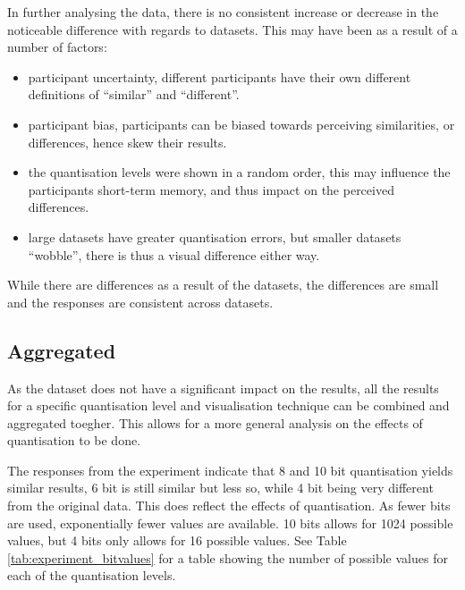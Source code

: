 In further analysing the data, there is no consistent increase or decrease in
the noticeable difference with regards to datasets.  This may have been as a
result of a number of factors:
\begin{itemize}

  \item participant uncertainty, different participants have their own
  different definitions of ``similar'' and ``different''.

  \item participant bias, participants can be biased towards perceiving
  similarities, or differences, hence skew their results.

  \item the quantisation levels were shown in a random order, this may
  influence the participants short-term memory, and thus impact on the
  perceived differences.

  \item large datasets have greater quantisation errors, but smaller datasets
  ``wobble'', there is thus a visual difference either way.

\end{itemize}

While there are differences as a result of the datasets, the differences are
small and the responses are consistent across datasets.


\subsection{Aggregated}
\label{sub:experiment_discussion_aggregated}

As the dataset does not have a significant impact on the results, all the
results for a specific quantisation level and visualisation technique can be
combined and aggregated toegher. This allows for a more general analysis on the
effects of quantisation to be done.

The responses from the experiment indicate that 8 and 10 bit quantisation
yields similar results, 6 bit is still similar but less so, while 4 bit being
very different from the original data. This does reflect the effects of
quantisation. As fewer bits are used, exponentially fewer values are available.
10 bits allows for 1024 possible values, but 4 bits only allows for 16 possible
values. See Table \ref{tab:experiment_bitvalues} for a table showing the number
of possible values for each of the quantisation levels.

